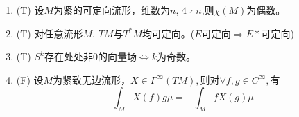 \documentclass{ctexart}
\numberwithin{equation}{section}
\theoremstyle{plain}
\theoremstyle{plain}
\numberwithin{equation}{section}
\theoremstyle{remark}
\begin{document}
\begin{enumerate}
	\item (T) 设$M$为紧的可定向流形，维数为$n$, $4 \nmid n$,则$\chi(M)$为偶数。
	\item (T) 对任意流形$M$, $TM$与$T^*M$均可定向。($E$可定向$\Rightarrow E*$可定向)
	\item (T) $S^k$存在处处非0的向量场$\Leftrightarrow k$为奇数。
	\item (F) 设$M$为紧致无边流形，$X \in \Gamma^{\infty}(TM), $则对$\forall f,g \in C^{\infty}, $有
	$$\int_{M}X(f)g \mu =-\int_{M}fX(g)\mu$$
\end{enumerate}
   
             






 
   



 




\end{document}
